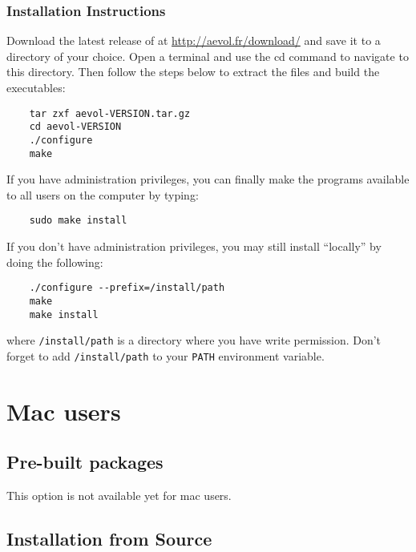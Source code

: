 \subsubsection{Installation Instructions}
Download the latest release of \aevol{} at \url{http://aevol.fr/download/} and save it to a directory of your choice.
Open a terminal and use the cd command to navigate to this directory.
Then follow the steps below to extract the files and build the executables:

\begin{verbatim}
	tar zxf aevol-VERSION.tar.gz
	cd aevol-VERSION
	./configure
	make
\end{verbatim}

If you have administration privileges, you can finally make the \aevol{} programs available to all users on the computer by typing:
\begin{verbatim}
	sudo make install
\end{verbatim}

If you don't have administration privileges, you may still install \aevol{} ``locally'' by doing the following: 
\begin{verbatim}
	./configure --prefix=/install/path
	make
	make install
\end{verbatim}
where \verb?/install/path? is a directory where you have write permission. Don't forget to add \verb?/install/path? to your \verb?PATH? environment variable.



\section{Mac users}
\label{sec:mac}

\subsection{Pre-built packages}
This option is not available yet for mac users.


\subsection{Installation from Source}
